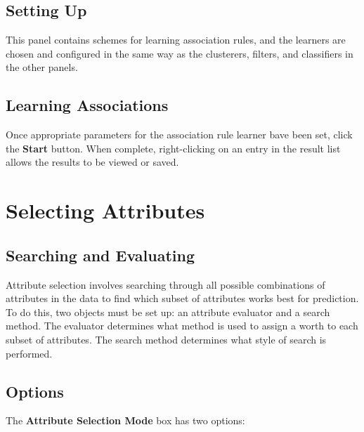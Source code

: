 \begin{center}
\end{center}

\subsection{Setting Up}

This panel contains schemes for learning association rules, and the
learners are chosen and configured in the same way as the clusterers,
filters, and classifiers in the other panels.

\subsection{Learning Associations}

Once appropriate parameters for the association rule learner bave been
set, click the \textbf{Start} button.  When complete, right-clicking
on an entry in the result list allows the results to be viewed or
saved.

\newpage

\section{Selecting Attributes}

\begin{center}
\end{center}

\subsection{Searching and Evaluating}

Attribute selection involves searching through all possible combinations of
attributes in the data to find which subset of attributes works best for
prediction.  To do this, two objects must be set up: an attribute evaluator and
a search method.  The evaluator determines what method is used to assign a
worth to each subset of attributes.  The search method determines what style of
search is performed.

\subsection{Options}

The \textbf{Attribute Selection Mode} box has two options:

